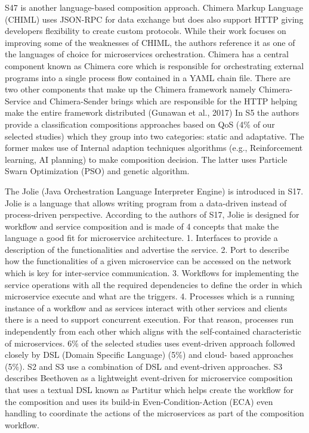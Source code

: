 \documentclass{article}
\begin{document}
\begin{multicols}{2}
S47 is another language-based composition approach. Chimera Markup Language (CHIML) uses JSON-RPC for data exchange but does also support HTTP giving developers flexibility to create custom protocols. While their work focuses on improving some of the weaknesses of CHIML, the authors reference it as one of the languages of choice for microservices orchestration. Chimera has a central component known as Chimera core which is responsible for orchestrating external programs into a single process flow contained in a YAML chain file. There are two other components that make up the Chimera framework namely Chimera-Service and Chimera-Sender brings which are responsible for the HTTP helping make the entire framework distributed (Gunawan et al., 2017)
In S5 the authors provide a classification compositions approaches based on QoS (4\% of our selected studies) which they group into two categories: static and adaptative. The former makes use of Internal adaption techniques algorithms (e.g., Reinforcement learning, AI planning) to make composition decision. The latter uses Particle Swarn Optimization (PSO) and genetic algorithm. 

The Jolie (Java Orchestration Language Interpreter Engine) is introduced in S17. Jolie is a language that allows writing program from a data-driven instead of process-driven perspective. According to the authors of S17, Jolie is designed for workflow and service composition and is made of 4 concepts that make the language a good fit for microservice architecture. 1. Interfaces to provide a description of the functionalities and advertise the service. 2. Port to describe how the functionalities of a given microservice can be accessed on the network which is key for inter-service communication. 3. Workflows for implementing the service operations with all the required dependencies to define the order in which microservice execute and what are the triggers. 4. Processes which is a running instance of a workflow and as services interact with other services and clients there is a need to support concurrent execution. For that reason, processes run independently from each other which aligns with the self-contained characteristic of microservices. 6\% of the selected studies uses event-driven approach followed closely by DSL (Domain Specific Language) (5\%) and cloud- based approaches (5\%). S2 and S3 use a combination of DSL and event-driven approaches. S3 describes Beethoven as a lightweight event-driven for microservice composition that uses a textual DSL known as Partitur which helps create the workflow for the composition and uses its build-in Even-Condition-Action (ECA) even handling to coordinate the actions of the microservices as part of the composition workflow. 


\end{multicols}
\end{document}
